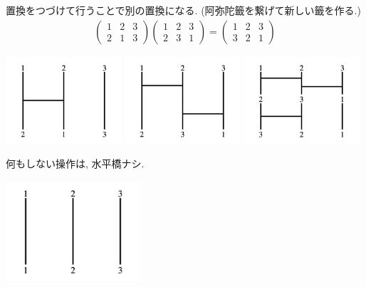 \documentclass[11pt, a4paper, dvipdfmx]{jsarticle}
\theoremstyle{definition}
\theoremstyle{mystyle}
\numberwithin{equation}{section} %
\begin{document}
置換をつづけて行うことで別の置換になる. 
(阿弥陀籤を繋げて新しい籤を作る.)
\begin{align*}
    \begin{pmatrix}
        1 & 2 & 3\\
        2 & 1 & 3
    \end{pmatrix}
    \begin{pmatrix}
        1 & 2 & 3\\
        2 & 3 & 1
    \end{pmatrix}
    =
    \begin{pmatrix}
        1 & 2 & 3\\
        3 & 2 & 1
    \end{pmatrix}
\end{align*}
\begin{center}
    \includegraphics[width=4.3cm]{permutation/permutation2.png}
    \includegraphics[width=4.3cm]{permutation/permutation1.png}
    \includegraphics[width=4.3cm]{permutation/permutation3.png}
\end{center}

何もしない操作は, 水平橋ナシ. 
\begin{center}
    \includegraphics[width=5cm]{permutation/permutation6.png}
\end{center}
\end{document}
